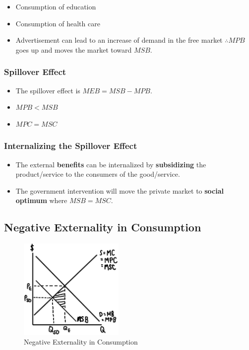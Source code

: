 \documentclass[
  letterpaper,
  DIV=11,
  numbers=noendperiod]{scrartcl}
\providecommand{\tightlist}{%
  \setlength{\itemsep}{0pt}\setlength{\parskip}{0pt}}\usepackage{longtable,booktabs,array}
\begin{document}
\begin{itemize}
\tightlist
\item
  Consumption of education
\item
  Consumption of health care
\item
  Advertisement can lead to an increase of demand in the free market
  \(\therefore MPB\) goes up and moves the market toward \(MSB\).
\end{itemize}

\subsubsection{Spillover Effect}\label{spillover-effect}

\begin{itemize}
\tightlist
\item
  The spillover effect is \(MEB = MSB-MPB\).
\item
  \(MPB < MSB\)
\item
  \(MPC = MSC\)
\end{itemize}

\subsubsection{Internalizing the Spillover
Effect}\label{internalizing-the-spillover-effect}

\begin{itemize}
\tightlist
\item
  The external \textbf{benefits} can be internalized by
  \textbf{subsidizing} the product/service to the consumers of the
  good/service.
\item
  The government intervention will move the private market to
  \textbf{social optimum} where \(MSB = MSC\).
\end{itemize}

\newpage{}

\subsection{Negative Externality in
Consumption}\label{negative-externality-in-consumption}

\begin{figure}[H]

{\centering \includegraphics[width=0.45\textwidth,height=\textheight]{img/neg-cons.png}

}

\caption{Negative Externality in Consumption}

\end{figure}%
\end{document}
